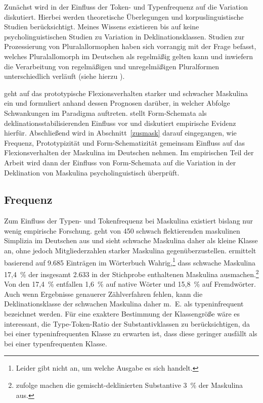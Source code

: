 \begin{sloppypar}
Zunächst wird in  der Einfluss der Token- und Typenfrequenz auf die Variation diskutiert. Hierbei werden theoretische Überlegungen und korpuslinguistische Studien berücksichtigt. Meines Wissens existieren bis auf \textcite{Schmitt.2019} keine psycholinguistischen Stu\-dien zu Variation in Deklinationsklassen. Studien zur Prozessierung von Pluralallormophen haben sich vorrangig mit der Frage befasst, welches Pluralallomorph im Deutschen als regelmäßig gelten kann und inwiefern die Verarbeitung von regelmäßigen und unregelmäßigen Pluralformen unterschiedlich verläuft (siehe hierzu ). 
\end{sloppypar}

\begin{sloppypar}
 geht auf das prototypische Flexionsverhalten starker und schwacher Maskulina ein und formuliert anhand dessen Prognosen darüber, in welcher Abfolge Schwankungen im Paradigma auftreten.  stellt Form-Schemata als deklinationsstabilisierenden Einfluss vor und diskutiert empirische Evidenz hierfür.  Abschließend wird in Abschnitt~\ref{zusmask} darauf eingegangen, wie Frequenz, Prototypizität und Form-Schematizität gemeinsam Einfluss auf das Flexionsverhalten der Maskulina im Deutschen nehmen. Im empirischen Teil der Arbeit wird dann der Einfluss von Form-Schemata auf die Variation in der Deklination von Maskulina psycholinguistisch überprüft.
\end{sloppypar}

\subsection{Frequenz}
\label{freqmask}

Zum Einfluss der Typen- und Tokenfrequenz bei Maskulina existiert bislang nur wenig empirische Forschung. \textcite[385]{Schafer.2019} geht von 450 schwach flektierenden maskulinen Simplizia im Deutschen aus und sieht schwache Maskulina daher als kleine Klasse an, ohne jedoch Mitgliederzahlen starker Maskulina gegenüberzustellen. \textcite[45]{Pavlov.1995} ermittelt basierend auf 9.685 Einträgen im Wörterbuch Wahrig,\footnote{Leider gibt \textcite[45]{Pavlov.1995} nicht an, um welche Ausgabe es sich handelt.} dass schwache Maskulina 17,4~\% der insgesamt 2.633 in der Stichprobe enthaltenen Maskulina ausmachen.\footnote{\textcite[45]{Pavlov.1995} zufolge machen die gemischt-deklinierten Substantive 3~\% der Maskulina aus.} Von den 17,4~\% entfallen 1,6~\% auf native Wörter und 15,8~\% auf Fremdwörter. Auch wenn Ergebnisse genauerer Zählverfahren fehlen, kann die Deklinationsklasse der schwachen Maskulina daher m.~E. als typeninfrequent bezeichnet werden. Für eine exaktere Bestimmung der Klassengröße wäre es interessant, die Type-Token-Ratio der Substantivklassen zu berücksichtigen, da bei einer typeninfrequenten Klasse zu erwarten ist, dass diese geringer ausfällt als bei einer typenfrequenten Klasse. 



